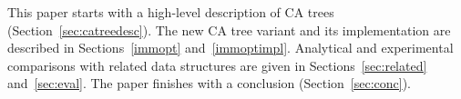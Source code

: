 \documentclass[a4paper,UKenglish]{oasics}
\begin{document}


This paper starts with a high-level description of CA trees (Section~\ref{sec:catreedesc}).
The new CA tree variant and its implementation are described in Sections~\ref{immopt} and~\ref{immoptimpl}.
Analytical and experimental comparisons with related data structures are given in Sections~\ref{sec:related} and~\ref{sec:eval}.
The paper finishes with a conclusion (Section~\ref{sec:conc}). 
\end{document}
